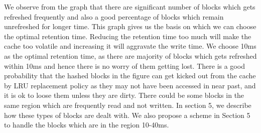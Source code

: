 We observe from the graph that there are significant number of blocks which gets refreshed frequently and also a good percentage of blocks which remain unrefreshed for longer time. This graph gives us the basis on which we can choose the optimal retention time. Reducing the retention time too much will make the cache too volatile and increasing it will aggravate the write time.  We choose 10ms as the optimal retention time, as there are majority of blocks which gets refreshed within 10ms and hence there is no worry of them getting lost. There is a good probability that the hashed blocks in the figure can get kicked out from the cache by LRU replacement policy as they may not have been accessed in near past, and it is ok to loose them unless they are dirty. There could be some blocks in the same region which are frequently read and not written. In section 5, we describe how these types of blocks are dealt with. We also propose a scheme in Section 5 to handle the blocks which are in the region 10-40ms.










